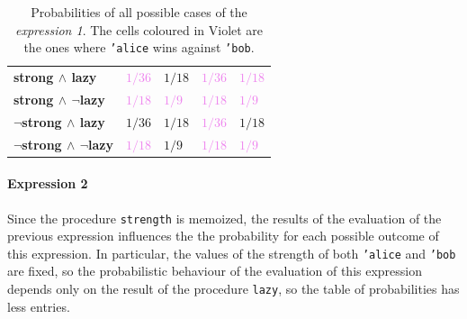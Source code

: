 \begin{itemize}
\begin{table}[H]
\begin{tabular}{| l | C{1.8cm} C{1.8cm} C{1.8cm} C{1.8cm}  |}
                    \textbf{strong $\land$ lazy} & \textcolor{Violet}{$1/36$} & \textcolor{RedOrange}{$1/18$} & 
                        \textcolor{Violet}{$1/36$} & \textcolor{Violet}{$1/18$} \\ 

                    \textbf{strong $\land$ $\neg$lazy} & \textcolor{Violet}{$1/18$} & \textcolor{Violet}{$1/9$} & 
                        \textcolor{Violet}{$1/18$} & \textcolor{Violet}{$1/9$} \\ 
                    
                    \textbf{$\neg$strong $\land$ lazy} & \textcolor{RedOrange}{$1/36$} & \textcolor{RedOrange}{$1/18$} & 
                        \textcolor{Violet}{$1/36$} & \textcolor{RedOrange}{$1/18$} \\ 
                    
                    \textbf{$\neg$strong $\land$ $\neg$lazy} & \textcolor{Violet}{$1/18$} & \textcolor{RedOrange}{$1/9$} & 
                        \textcolor{Violet}{$1/18$} & \textcolor{Violet}{$1/9$} \\
                    \hline
                \end{tabular}
            \egroup
            \caption{
                Probabilities of all possible cases of the \textit{expression 1}. The cells coloured in Violet are the ones where
                \texttt{'alice} wins against \texttt{'bob}.
            }
            \label{tab:exp-1}
        \end{table}
     
        \paragraph*{Expression 2} Since the procedure \texttt{strength} is memoized, the results of the evaluation of the previous
        expression influences the the probability for each possible outcome of this expression.
        In particular, the values of the strength of both \texttt{'alice} and \texttt{'bob} are fixed, so the probabilistic
        behaviour of the evaluation of this expression depends only on the result of the procedure \texttt{lazy}, so the table
        of probabilities has less entries.


\end{itemize}
